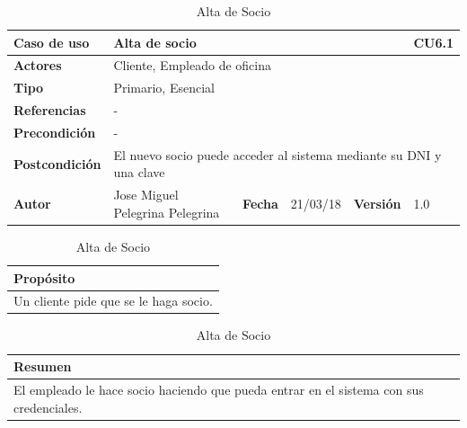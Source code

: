 \documentclass[12pt,spanish]{article}
\begin{document}
\begin{table}[H]
\centering
\begin{tabular}{|m{3cm}|m{4cm}|m{2cm}|m{2cm}|m{2cm}|m{1cm}|}
\hline
\textbf{Caso de uso} &  \multicolumn{4}{m{8cm}|}{Alta de socio} \vline &  \cellcolor{gray!40}CU6.1 \\
\hline
\textbf{Actores} & \multicolumn{5}{m{8cm}|}{Cliente, Empleado de oficina} \\
\hline
\textbf{Tipo} & \multicolumn{5}{m{8cm}|}{Primario, Esencial} \\
\hline
\textbf{Referencias} &\multicolumn{5}{m{8cm}|}{-} \\
\hline
\textbf{Precondición} & \multicolumn{5}{m{8cm}|}{-} \\
\hline
\textbf{Postcondición} & \multicolumn{5}{m{8cm}|}{El nuevo socio puede acceder al sistema mediante su DNI y una clave} \\
\hline
\textbf{Autor} & Jose Miguel Pelegrina Pelegrina & \textbf{Fecha} & 21/03/18 & \textbf{Versión} & 1.0 \\
\hline
\end{tabular}

\vspace{1cm}

\begin{tabular}{|m{16.2cm}|}
\hline
\textbf{Propósito} \\
\hline
Un cliente pide que se le haga socio. \\
\hline
\end{tabular}

\vspace{1cm}

\begin{tabular}{|m{16.2cm}|}
\hline
\textbf{Resumen} \\
\hline
El empleado le hace socio haciendo que pueda entrar en el sistema con sus credenciales. \\
\hline
\end{tabular}

\caption{Alta de Socio}
\label{cu:6}
\end{table}
\end{document}
